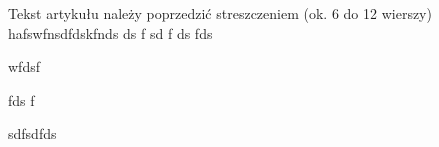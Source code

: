 \documentclass[11pt,twoside]{article}
\begin{document}
 Tekst artykułu należy poprzedzić streszczeniem (ok. 6 do 12 wierszy) 
 hafswfnsdfdskfnds ds
  f
  sd
  f
  ds
  fds



wfdsf

fds
f


sdfsdfds
\end{document}
